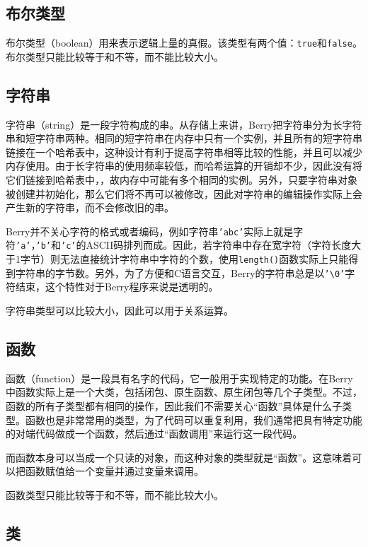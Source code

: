 \subsection{布尔类型}

布尔类型（boolean）用来表示逻辑上量的真假。该类型有两个值：\texttt{true}和\texttt{false}。布尔类型只能比较等于和不等，而不能比较大小。

\subsection{字符串}

字符串（string）是一段字符构成的串。从存储上来讲，Berry把字符串分为长字符串和短字符串两种。相同的短字符串在内存中只有一个实例，并且所有的短字符串链接在一个哈希表中，这种设计有利于提高字符串相等比较的性能，并且可以减少内存使用。由于长字符串的使用频率较低，而哈希运算的开销却不少，因此没有将它们链接到哈希表中，，故内存中可能有多个相同的实例。另外，只要字符串对象被创建并初始化，那么它们将不再可以被修改，因此对字符串的编辑操作实际上会产生新的字符串，而不会修改旧的串。

Berry并不关心字符的格式或者编码，例如字符串\texttt{'abc'}实际上就是字符\texttt{'a'}，\texttt{'b'}和\texttt{'c'}的ASCII码排列而成。因此，若字符串中存在宽字符（字符长度大于1字节）则无法直接统计字符串中字符的个数，使用\texttt{length()}函数实际上只能得到字符串的字节数。另外，为了方便和C语言交互，Berry的字符串总是以\texttt{'\textbackslash 0'}字符结束，这个特性对于Berry程序来说是透明的。

字符串类型可以比较大小，因此可以用于关系运算。

\subsection{函数}

函数（function）是一段具有名字的代码，它一般用于实现特定的功能。在Berry中函数实际上是一个大类，包括闭包、原生函数、原生闭包等几个子类型。不过，函数的所有子类型都有相同的操作，因此我们不需要关心``函数''具体是什么子类型。函数也是非常常用的类型，为了代码可以重复利用，我们通常把具有特定功能的对端代码做成一个函数，然后通过``函数调用''来运行这一段代码。

而函数本身可以当成一个只读的对象，而这种对象的类型就是``函数''。这意味着可以把函数赋值给一个变量并通过变量来调用。

函数类型只能比较等于和不等，而不能比较大小。

\subsection{类}

